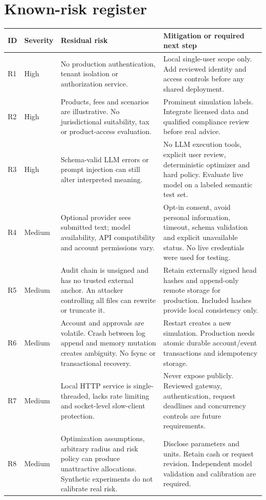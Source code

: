 \documentclass[11pt,a4paper]{article}
\begin{document}
\section{Known-risk register}
\small
\begin{longtable}{p{.08\linewidth}p{.14\linewidth}>{\raggedright\arraybackslash}p{.33\linewidth}>{\raggedright\arraybackslash}p{.33\linewidth}}
\toprule ID & Severity & Residual risk & Mitigation or required next step\\\midrule
R1 & High & No production authentication, tenant isolation or authorization service. & Local single-user scope only. Add reviewed identity and access controls before any shared deployment.\\
R2 & High & Products, fees and scenarios are illustrative. No jurisdictional suitability, tax or product-access evaluation. & Prominent simulation labels. Integrate licensed data and qualified compliance review before real advice.\\
R3 & High & Schema-valid LLM errors or prompt injection can still alter interpreted meaning. & No LLM execution tools, explicit user review, deterministic optimizer and hard policy. Evaluate live model on a labeled semantic test set.\\
R4 & Medium & Optional provider sees submitted text; model availability, API compatibility and account permissions vary. & Opt-in consent, avoid personal information, timeout, schema validation and explicit unavailable status. No live credentials were used for testing.\\
R5 & Medium & Audit chain is unsigned and has no trusted external anchor. An attacker controlling all files can rewrite or truncate it. & Retain externally signed head hashes and append-only remote storage for production. Included hashes provide local consistency only.\\
R6 & Medium & Account and approvals are volatile. Crash between log append and memory mutation creates ambiguity. No fsync or transactional recovery. & Restart creates a new simulation. Production needs atomic durable account/event transactions and idempotency storage.\\
R7 & Medium & Local HTTP service is single-threaded, lacks rate limiting and socket-level slow-client protection. & Never expose publicly. Reviewed gateway, authentication, request deadlines and concurrency controls are future requirements.\\
R8 & Medium & Optimization assumptions, arbitrary radius and risk policy can produce unattractive allocations. Synthetic experiments do not calibrate real risk. & Disclose parameters and units. Retain cash or request revision. Independent model validation and calibration are required.\\

\end{longtable}
\end{document}
